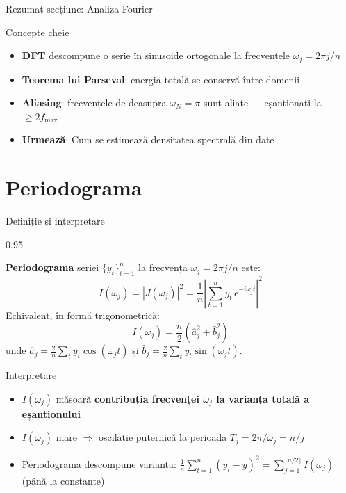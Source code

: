 \documentclass[9pt, aspectratio=169, t]{beamer}
\begin{document}
\begin{frame}{Rezumat secțiune: Analiza Fourier}
\begin{block}{Concepte cheie}
\begin{itemize}\setlength{\itemsep}{3pt}
    \item \textbf{DFT} descompune o serie în sinusoide ortogonale la frecvențele $\omega_j = 2\pi j/n$
    \item \textbf{Teorema lui Parseval}: energia totală se conservă între domenii
    \item \textbf{Aliasing}: frecvențele de deasupra $\omega_N = \pi$ sunt aliate --- eșantionați la $\geq 2f_{\max}$
    \item \textbf{Urmează}: Cum se estimează densitatea spectrală din date
\end{itemize}
\end{block}
\end{frame}

\section{Periodograma}

\begin{frame}{Definiție și interpretare}
    \begin{cminipage}{0.95\textwidth}
    \vspace{-2mm}
    \begin{defn}[Periodograma]
        {\small \textbf{Periodograma} seriei $\{y_t\}_{t=1}^n$ la frecvența $\omega_j = 2\pi j / n$ este:
        \[
            I(\omega_j) = |J(\omega_j)|^2 = \frac{1}{n}\left|\sum_{t=1}^{n} y_t \, e^{-i\omega_j t}\right|^2
        \]
        Echivalent, în formă trigonometrică:
        \[
            I(\omega_j) = \frac{n}{2}\left(\hat{a}_j^2 + \hat{b}_j^2\right)
        \]
        unde $\hat{a}_j = \frac{2}{n}\sum_t y_t \cos(\omega_j t)$ și $\hat{b}_j = \frac{2}{n}\sum_t y_t \sin(\omega_j t)$.}
    \end{defn}
    \vspace{-2mm}
    \begin{exampleblock}{Interpretare}
        \begin{itemize}\setlength{\itemsep}{0pt}
            \item $I(\omega_j)$ măsoară \textbf{contribuția frecvenței $\omega_j$ la varianța totală a eșantionului}
            \item $I(\omega_j)$ mare $\Rightarrow$ oscilație puternică la perioada $T_j = 2\pi/\omega_j = n/j$
            \item Periodograma descompune varianța: $\frac{1}{n}\sum_{t=1}^n (y_t - \bar{y})^2 = \sum_{j=1}^{\lfloor n/2 \rfloor} I(\omega_j)$ (până la constante)
        \end{itemize}
    \end{exampleblock}
    \end{cminipage}
\end{frame}
\end{document}
